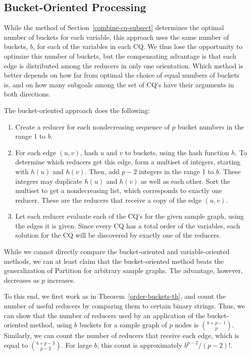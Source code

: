 \subsection{Bucket-Oriented Processing}
\label{bucket-oriented-subsect}

While the method of Section~\ref{combine-cq-subsect} determines the optimal number of buckets for each variable, this approach uses the same number of buckets, $b$, for each of the variables in each CQ.  We thus lose the opportunity to optimize this number of buckets, but the compensating advantage is that each edge is distributed among the reducers in only one orientation.  Which method is better depends on how far from optimal the choice of equal numbers of buckets is, and on how many subgoals among the set of CQ's have their arguments in both directions.

The bucket-oriented approach does the following:

\begin{enumerate}
\item Create a reducer for each nondecreasing sequence of $p$ bucket numbers in the range 1 to $b$.

\item For each edge $(u,v)$, hash $u$ and $v$ to buckets, using the hash function $h$.  To determine which reducers get this edge, form a multiset of integers, starting with $h(u)$ and $h(v)$.  Then, add $p-2$ integers in the range 1 to $b$.   These integers may duplicate $h(u)$ and $h(v)$ as well as each other.  Sort the multiset to get a nondecreasing list, which corresponds to exactly one reducer.  These are the reducers that receive a copy of the edge $(u,v)$.

\item Let each reducer evaluate each of the CQ's for the given sample graph, using the edges it is given.  Since every CQ has a total order of the variables, each solution for the CQ will be discovered by exactly one of the reducers.
\end{enumerate}

While we cannot directly compare the bucket-oriented and vari\-able-oriented methods, we can at least claim that the bucket-ori\-ented method beats the generalization of Partition for arbitrary sample graphs. The advantage, however, decreases as $p$ increases.

To this end, we first work as in Theorem~\ref{order-buckets-th}, and count the number of useful reducers by comparing them to certain binary strings. Thus, we can show that the number of reducers used by an application of the bucket-oriented method, using $b$ buckets for a sample graph of $p$ nodes is $\binom{b+p-1}{p}$.
Similarly, we can count the number of reducers that receive each edge, which is equal to $\binom{b+p-3}{p-2}$. For large $b$, this count is approximately $b^{p-2}/(p-2)!$.

